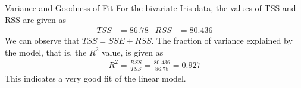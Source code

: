 \begin{frame}{Variance and Goodness of Fit}
    For the bivariate Iris data, the values of TSS and RSS are given as
    \begin{align*}
        TSS & = 86.78 & RSS & = 80.436
    \end{align*}
    We can observe that $TSS = SSE + RSS$.
    The fraction of variance explained by the model, that is, the $R^2$
    value, is given as
    \begin{align*}
        R^2 = \frac{RSS}{TSS} = \frac{80.436}{86.78} = 0.927
    \end{align*}
    This indicates a very good fit of the linear model.
\end{frame}
%
%
%
%
%
%
%
